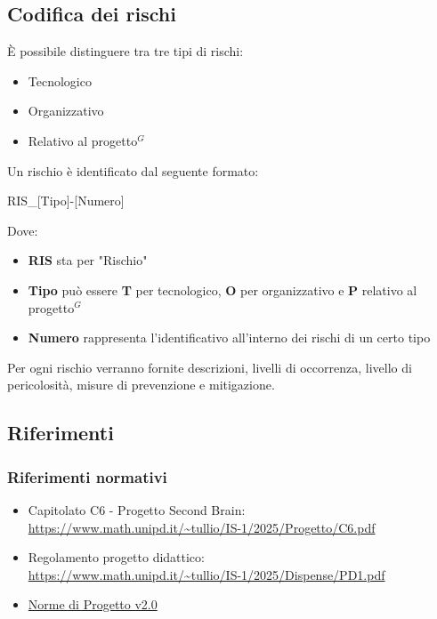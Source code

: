 \documentclass[a4paper,10pt]{article}
\begin{document}
\subsection{Codifica dei rischi}
È possibile distinguere tra tre tipi di rischi: 
\begin{itemize}
  \item Tecnologico
  \item Organizzativo
  \item Relativo al progetto$^G$
\end{itemize}
Un rischio è identificato dal seguente formato:
\begin{center}
  RIS\_[Tipo]-[Numero]
\end{center}
Dove: 
\begin{itemize}
  \item \textbf{RIS} sta per "Rischio"
  \item \textbf{Tipo} può essere \textbf{T} per tecnologico, \textbf{O} per organizzativo e \textbf{P} relativo al progetto$^G$
  \item \textbf{Numero} rappresenta l'identificativo all'interno dei rischi di un certo tipo
\end{itemize}
Per ogni rischio verranno fornite descrizioni, livelli di occorrenza, livello di pericolosità, misure di prevenzione e mitigazione.

\subsection{Riferimenti}
\subsubsection{Riferimenti normativi}
\begin{itemize}
  \item Capitolato C6 - Progetto Second Brain: \\  \url{https://www.math.unipd.it/~tullio/IS-1/2025/Progetto/C6.pdf}
  \item Regolamento progetto didattico: \\ \url{https://www.math.unipd.it/~tullio/IS-1/2025/Dispense/PD1.pdf}
  \item \href{https://tool-8.github.io/Documentazione-SWE/pb/Norme_di_Progetto_v2.0.pdf}{Norme di Progetto v2.0}
\end{itemize}
\end{document}
